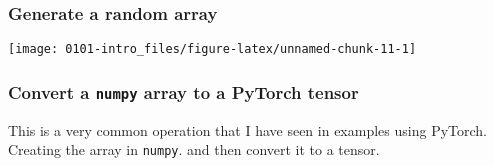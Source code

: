 \documentclass[]{book}
\newenvironment{Shaded}{\begin{snugshade}}{\end{snugshade}}
\newcommand{\CommentTok}[1]{\textcolor[rgb]{0.56,0.35,0.01}{\textit{#1}}}
\newcommand{\FloatTok}[1]{\textcolor[rgb]{0.00,0.00,0.81}{#1}}
\newcommand{\KeywordTok}[1]{\textcolor[rgb]{0.13,0.29,0.53}{\textbf{#1}}}
\newcommand{\NormalTok}[1]{#1}
\newcommand{\OperatorTok}[1]{\textcolor[rgb]{0.81,0.36,0.00}{\textbf{#1}}}
\newcommand{\StringTok}[1]{\textcolor[rgb]{0.31,0.60,0.02}{#1}}
\begin{document}
\hypertarget{generate-a-random-array}{%
\subsubsection*{Generate a random array}\label{generate-a-random-array}}

\begin{Shaded}
\end{Shaded}

\begin{center}\texttt{[image: 0101-intro\_files/figure-latex/unnamed-chunk-11-1]} \end{center}

\hypertarget{convert-a-numpy-array-to-a-pytorch-tensor}{%
\subsubsection*{\texorpdfstring{Convert a \texttt{numpy} array to a PyTorch tensor}{Convert a numpy array to a PyTorch tensor}}\label{convert-a-numpy-array-to-a-pytorch-tensor}}

This is a very common operation that I have seen in examples using PyTorch. Creating the array in \texttt{numpy}. and then convert it to a tensor.
\end{document}
